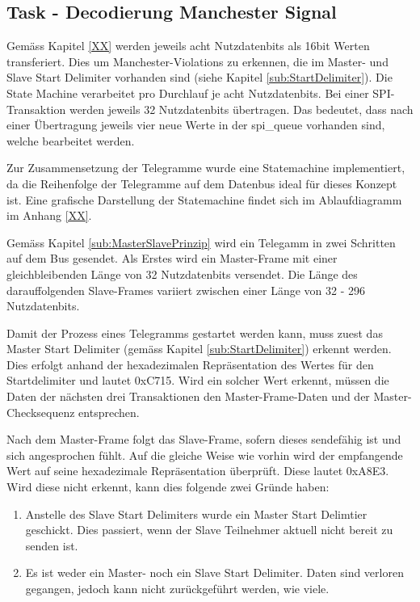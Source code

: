 \subsection{Task - Decodierung Manchester Signal}
\label{sub:MvbManchDecode}
Gemäss Kapitel \textcolor{red}{\ref{XX}} werden jeweils acht Nutzdatenbits als 16bit Werten transferiert. Dies um Manchester-Violations zu erkennen, die im Master- und Slave Start Delimiter vorhanden sind (siehe Kapitel \ref{sub:StartDelimiter}). Die State Machine verarbeitet pro Durchlauf je acht Nutzdatenbits. Bei einer SPI-Transaktion werden jeweils 32 Nutzdatenbits übertragen. Das bedeutet, dass nach einer Übertragung jeweils vier neue Werte in der spi\_queue vorhanden sind, welche bearbeitet werden. 

Zur Zusammensetzung der Telegramme wurde eine Statemachine implementiert, da die Reihenfolge der Telegramme auf dem Datenbus ideal für dieses Konzept ist. Eine grafische Darstellung der Statemachine findet sich im Ablaufdiagramm im Anhang \textcolor{red}{\ref{XX}}.

Gemäss Kapitel \ref{sub:MasterSlavePrinzip} wird ein Telegamm in zwei Schritten auf dem Bus gesendet. Als Erstes wird ein Master-Frame mit einer gleichbleibenden Länge von 32 Nutzdatenbits versendet. Die Länge des darauffolgenden Slave-Frames variiert zwischen einer Länge von 32 - 296 Nutzdatenbits.

Damit der Prozess eines Telegramms gestartet werden kann, muss zuest das Master Start Delimiter (gemäss Kapitel \ref{sub:StartDelimiter}) erkennt werden. Dies erfolgt anhand der hexadezimalen Repräsentation des Wertes für den Startdelimiter und lautet 0xC715. Wird ein solcher Wert erkennt, müssen die Daten der nächsten drei Transaktionen den Master-Frame-Daten und der Master-Checksequenz entsprechen.

Nach dem Master-Frame folgt das Slave-Frame, sofern dieses sendefähig ist und sich angesprochen fühlt. Auf die gleiche Weise wie vorhin wird der empfangende Wert auf seine hexadezimale Repräsentation überprüft. Diese lautet 0xA8E3. Wird diese nicht erkennt, kann dies folgende zwei Gründe haben:

\begin{enumerate}
    \item Anstelle des Slave Start Delimiters wurde ein Master Start Delimtier geschickt. Dies passiert, wenn der Slave Teilnehmer aktuell nicht bereit zu senden ist. 
    \item Es ist weder ein Master- noch ein Slave Start Delimiter. Daten sind verloren gegangen, jedoch kann nicht zurückgeführt werden, wie viele.
\end{enumerate}

